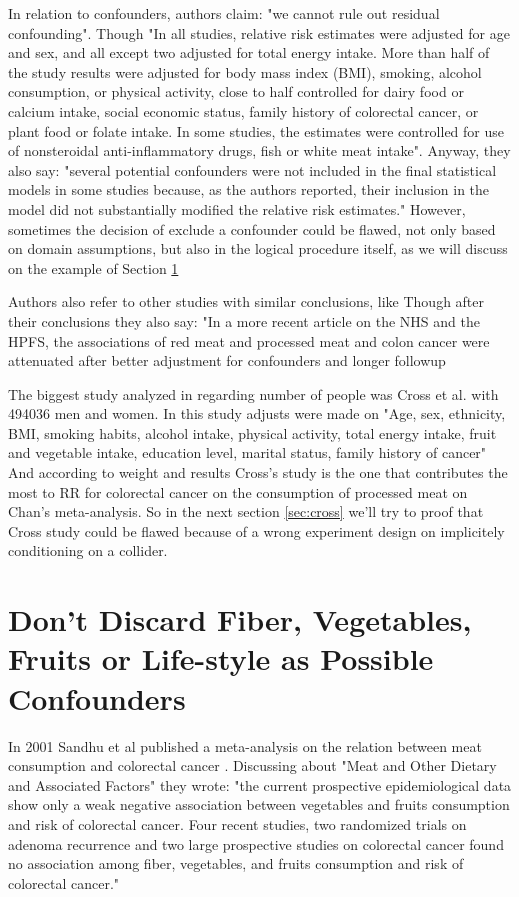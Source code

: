 \documentclass{article}
\begin{document}
In relation to confounders, authors claim: "we cannot rule out residual confounding". Though "In all studies, relative risk estimates were adjusted for age and sex, and all except two adjusted for total energy intake. More than
half of the study results were adjusted for body mass index (BMI),
smoking, alcohol consumption, or physical activity, close to half
controlled for dairy food or calcium intake, social economic status,
family history of colorectal cancer, or plant food or folate intake.
In some studies, the estimates were controlled for use of nonsteroidal
anti-inflammatory drugs, fish or white meat intake". Anyway, they also say: "several
potential confounders were not included in the final statistical
models in some studies because, as the authors reported, their
inclusion in the model did not substantially modified the relative
risk estimates." However, sometimes the decision of exclude a confounder could be flawed, not only based on domain assumptions, but also in the logical procedure itself, as we will discuss on the example of Section \ref{sec:sandhu}

Authors also refer to other studies with similar conclusions, like \cite{aicr,wei2009}
Though after their conclusions they also say: "In a more recent article on the NHS and the HPFS, the
associations of red meat and processed meat and colon cancer were
attenuated after better adjustment for confounders and longer followup \cite{wei}

The biggest study analyzed in \cite{chan} regarding number of people was Cross et al. \cite{cross} with 494036 men and women. In this study adjusts were made on "Age, sex, ethnicity, BMI, smoking habits, alcohol intake, physical activity, total energy intake, fruit and vegetable intake, education level, marital status, family history of cancer"
And according to weight and results Cross's study is the one that contributes the most to RR for colorectal cancer on the consumption of processed meat on Chan's meta-analysis. So in the next section \ref{sec:cross} we'll try to proof that Cross study could be flawed because of a wrong experiment design on implicitely conditioning on a collider.



\section{Don't Discard Fiber, Vegetables, Fruits or Life-style as Possible Confounders}
\label{sec:sandhu}
In 2001 Sandhu et al published a meta-analysis on the relation between meat consumption and colorectal cancer \cite{sandhu}. Discussing about "Meat and Other Dietary and Associated Factors" they wrote: "the current
prospective epidemiological data show only a weak negative
association between vegetables and fruits consumption and risk
of colorectal cancer. Four recent studies, two randomized
trials on adenoma recurrence and two large prospective
studies on colorectal cancer found no association
among fiber, vegetables, and fruits consumption and risk of colorectal cancer."
\end{document}
